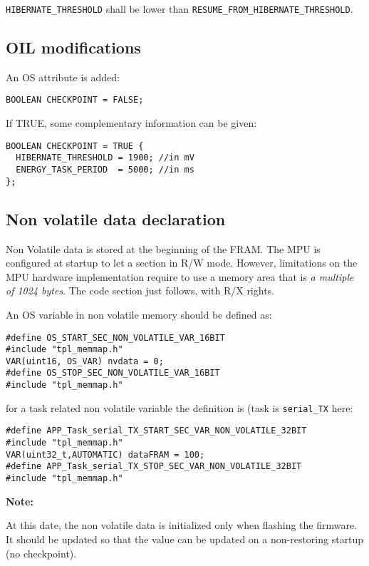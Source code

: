 \documentclass[11pt, oneside]{article}   	%
\begin{document}
\lstinline{HIBERNATE_THRESHOLD} shall be lower than \lstinline{RESUME_FROM_}\-\lstinline{HIBERNATE_THRESHOLD}.

\subsection{OIL modifications}

An OS attribute is added:

\begin{lstlisting}
BOOLEAN CHECKPOINT = FALSE;
\end{lstlisting}

If TRUE, some complementary information can be given:
\begin{lstlisting}
BOOLEAN CHECKPOINT = TRUE {
  HIBERNATE_THRESHOLD = 1900; //in mV
  ENERGY_TASK_PERIOD  = 5000; //in ms
};
\end{lstlisting}


\subsection{Non volatile data declaration}

Non Volatile data is stored at the beginning of the FRAM. The MPU is configured at startup to let a section in R/W mode. However, limitations on the MPU hardware implementation require to use a memory area that is \emph{a multiple of 1024 bytes}. The code section just follows, with R/X rights.

An OS variable in non volatile memory should be defined as:

\begin{lstlisting}
#define OS_START_SEC_NON_VOLATILE_VAR_16BIT
#include "tpl_memmap.h"
VAR(uint16, OS_VAR) nvdata = 0;
#define OS_STOP_SEC_NON_VOLATILE_VAR_16BIT
#include "tpl_memmap.h"
\end{lstlisting}

for a task related non volatile variable the definition is (task is \lstinline{serial_TX} here:

\begin{lstlisting}
#define APP_Task_serial_TX_START_SEC_VAR_NON_VOLATILE_32BIT
#include "tpl_memmap.h"
VAR(uint32_t,AUTOMATIC) dataFRAM = 100;
#define APP_Task_serial_TX_STOP_SEC_VAR_NON_VOLATILE_32BIT
#include "tpl_memmap.h"
\end{lstlisting}

\textbf{Note:}

At this date, the non volatile data is initialized only when flashing the firmware. It should be updated so that the value can be updated on a non-restoring startup (no checkpoint).
\end{document}
